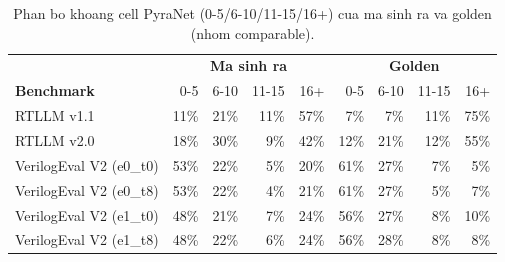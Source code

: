 \begin{table}[htbp]
    \centering
    \caption{Phan bo khoang cell PyraNet (0-5/6-10/11-15/16+) cua ma sinh ra va golden (nhom comparable).}
    \label{tab:pyranet-bucket}
    \begin{tabular}{lrrrrrrrr}
        \toprule
         & \multicolumn{4}{c}{\textbf{Ma sinh ra}} & \multicolumn{4}{c}{\textbf{Golden}} \\
        \textbf{Benchmark} & 0-5 & 6-10 & 11-15 & 16+ & 0-5 & 6-10 & 11-15 & 16+ \\
        \midrule
        RTLLM v1.1 & 11\% & 21\% & 11\% & 57\% & 7\% & 7\% & 11\% & 75\% \\
        RTLLM v2.0 & 18\% & 30\% & 9\% & 42\% & 12\% & 21\% & 12\% & 55\% \\
        VerilogEval V2 (e0_t0) & 53\% & 22\% & 5\% & 20\% & 61\% & 27\% & 7\% & 5\% \\
        VerilogEval V2 (e0_t8) & 53\% & 22\% & 4\% & 21\% & 61\% & 27\% & 5\% & 7\% \\
        VerilogEval V2 (e1_t0) & 48\% & 21\% & 7\% & 24\% & 56\% & 27\% & 8\% & 10\% \\
        VerilogEval V2 (e1_t8) & 48\% & 22\% & 6\% & 24\% & 56\% & 28\% & 8\% & 8\% \\
        \bottomrule
    \end{tabular}
\end{table}